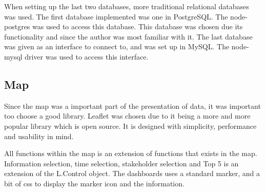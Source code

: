 When setting up the last two databases, more traditional relational databases 
was used. The first database implemented was one in PostgreSQL\cite{postgreSQLAbout}.
The node-postgres\cite{node-postgres} was used to access this database.
This database was chosen due its functionality and since the author was most
familiar with it. The last database was given as an interface to connect to,
and was set up in MySQL\cite{mySQLAbout}. The node-mysql\cite{node-mysql} 
driver was used to access this interface.

\subsection{Map} %
\label{sub:map}
Since the map was a important part of the presentation of data, it was
important too choose a good library. Leaflet\cite{leaflet} was chosen due to it
being a more and more popular library which is open source. It is designed 
with simplicity, performance and usability in mind.

All functions within the map is an extension of functions that exists in the
map. Information selection, time selection, stakeholder selection and Top 5 is
an extension of the L.Control object. The dashboards uses a standard marker,
and a bit of css to display the marker icon and the information. 


